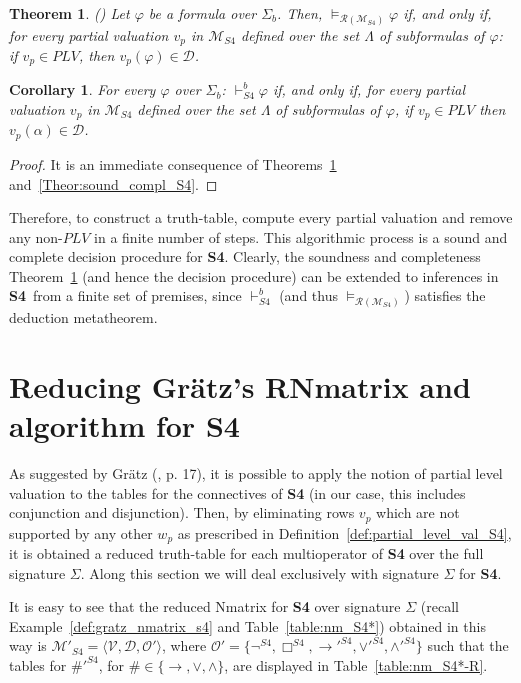 \documentclass[12pt]{article}
\newtheorem{theorem}{Theorem}[section]
\newtheorem{corollary}{Corollary}[theorem]
\newcommand{\sfo}{\textbf{S4}}
\begin{document}
\begin{theorem}   {\em(\cite[Theorem~3.15]{gratz_truth_2022})} \label{theorem:gratz_an_coan}
Let $\varphi$ be a formula over $\Sigma_b$. Then,    $\models_{\mathcal{R}(\mathcal{M}_{S4})} \varphi$ if, and only if, for every partial valuation $v_p$ in $\mathcal{M}_{S4}$ defined over the set $\Lambda$ of subformulas of $\varphi$: if $v_p \in PLV$, then $v_p(\varphi) \in \mathcal{D}$.
\end{theorem}


\begin{corollary}  \label{Theor:sound_compl_S4-1} For every $\varphi$ over $\Sigma_b$: $\vdash_{S4}^b \varphi$ if, and only if, for every partial valuation $v_p$ in $\mathcal{M}_{S4}$ defined over the set $\Lambda$ of subformulas of $\varphi$, if $v_p \in PLV$ then $v_p(\alpha) \in \mathcal{D}$.
\end{corollary}
\begin{proof}
It is an immediate consequence of Theorems~\ref{theorem:gratz_an_coan} and~\ref{Theor:sound_compl_S4}.
\end{proof}

Therefore, to construct a truth-table, compute every partial valuation and remove any non-$PLV$ in a finite number of steps. This algorithmic process is a sound and complete decision procedure for \sfo. Clearly, the soundness and completeness Theorem~\ref{theorem:gratz_an_coan} (and hence the decision procedure) can be extended to inferences in \sfo\ from a finite set of premises, since $\vdash_{S4}^b$ (and thus $\models_{\mathcal{R}(\mathcal{M}_{S4})}$) satisfies the deduction metatheorem.


\section{Reducing Gr\"atz's RNmatrix and algorithm for \sfo} \label{sect:redu_RNmat_S4}

As suggested by Gr\"atz (\cite{gratz_truth_2022}, p. 17), it is possible to apply the notion of partial level valuation to the tables for the connectives of  \textbf{S4} (in our case, this includes conjunction and disjunction). Then, by eliminating rows $v_p$ which are not supported by any other $w_p$ as prescribed in Definition~\ref{def:partial_level_val_S4}, it is obtained a reduced truth-table for each multioperator of  \textbf{S4} over the full signature $\Sigma$. Along this section we will deal exclusively with signature $\Sigma$ for  \textbf{S4}.


It is easy to see that the reduced Nmatrix for  \textbf{S4} over signature $\Sigma$ (recall Example~\ref{def:gratz_nmatrix_s4} and Table~\ref{table:nm_S4*}) obtained in this way is $\mathcal{M}'_{S4} = \langle  \mathcal{V}, \mathcal{D}, \mathcal{O}' \rangle$, where $\mathcal{O}' = \{ \neg^{S4}, \Box^{S4}, \rightarrow'^{S4}, \lor'^{S4}, \land'^{S4} \}$ such that the tables for $\#'^{S4}$, for $\# \in \{\to, \vee, \land\}$, are displayed in Table~\ref{table:nm_S4*-R}.
\end{document}
